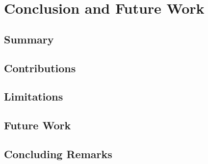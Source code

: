 \chapter{Conclusion and Future Work}
\label{chapter:conclusion}




\section{Summary}



\section{Contributions}



\section{Limitations}



\section{Future Work}



\section{Concluding Remarks}

